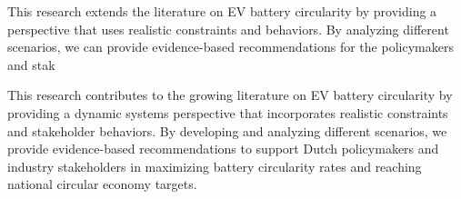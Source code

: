 This research extends the literature on EV battery circularity by providing a perspective that uses realistic constraints and behaviors. By analyzing different scenarios, we can provide evidence-based recommendations for the policymakers and stak 

This research contributes to the growing literature on EV battery circularity by providing a dynamic systems perspective that incorporates realistic constraints and stakeholder behaviors. By developing and analyzing different scenarios, we provide evidence-based recommendations to support Dutch policymakers and industry stakeholders in maximizing battery circularity rates and reaching national circular economy targets.